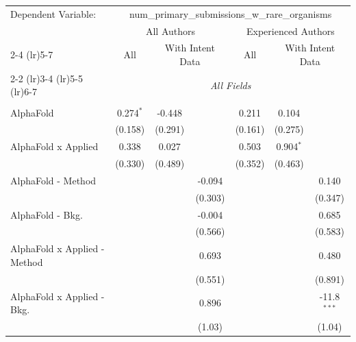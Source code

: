 \begingroup
\centering
\begin{tabular}{lcccccc}
   \tabularnewline \midrule \midrule
   Dependent Variable: & \multicolumn{6}{c}{num\_primary\_submissions\_w\_rare\_organisms}\\
 & \multicolumn{3}{c}{All Authors} & \multicolumn{3}{c}{Experienced Authors} \\
\cmidrule(lr){2-4} \cmidrule(lr){5-7}
 & \multicolumn{1}{c}{All} & \multicolumn{2}{c}{With Intent Data} & \multicolumn{1}{c}{All} & \multicolumn{2}{c}{With Intent Data} \\
\cmidrule(lr){2-2} \cmidrule(lr){3-4} \cmidrule(lr){5-5} \cmidrule(lr){6-7}
 & \multicolumn{6}{c}{\textit{All Fields}} \\ \\
   AlphaFold                      & 0.274$^{*}$ & -0.448  &              & 0.211         & 0.104         &   \\   
                                  & (0.158)     & (0.291) &              & (0.161)       & (0.275)       &   \\   
   AlphaFold x Applied            & 0.338       & 0.027   &              & 0.503         & 0.904$^{*}$   &   \\   
                                  & (0.330)     & (0.489) &              & (0.352)       & (0.463)       &   \\   
   AlphaFold - Method             &             &         & -0.094       &               &               & 0.140\\   
                                  &             &         & (0.303)      &               &               & (0.347)\\   
   AlphaFold - Bkg.               &             &         & -0.004       &               &               & 0.685\\   
                                  &             &         & (0.566)      &               &               & (0.583)\\   
   AlphaFold x Applied - Method   &             &         & 0.693        &               &               & 0.480\\   
                                  &             &         & (0.551)      &               &               & (0.891)\\   
   AlphaFold x Applied - Bkg.     &             &         & 0.896        &               &               & -11.8$^{***}$\\   
                                  &             &         & (1.03)       &               &               & (1.04)\\   

\end{tabular}
